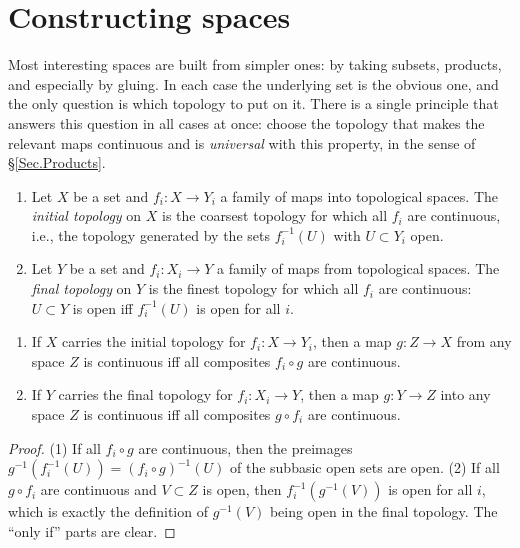 \section{Constructing spaces}\label{sec: constructing spaces}

Most interesting spaces are built from simpler ones: by taking subsets, products, and especially by gluing. In each case the underlying set is the obvious one, and the only question is which topology to put on it. There is a single principle that answers this question in all cases at once: choose the topology that makes the relevant maps continuous and is \emph{universal} with this property, in the sense of \S\ref{Sec.Products}.

\begin{defn}
    \begin{enumerate}
        \item Let $X$ be a set and $f_i:X\to Y_i$ a family of maps into topological spaces. The \emph{initial topology} on $X$ is the coarsest topology for which all $f_i$ are continuous, i.e., the topology generated by the sets $f_i^{-1}(U)$ with $U\subset Y_i$ open.
        \item Let $Y$ be a set and $f_i:X_i\to Y$ a family of maps from topological spaces. The \emph{final topology} on $Y$ is the finest topology for which all $f_i$ are continuous: $U\subset Y$ is open iff $f_i^{-1}(U)$ is open for all $i$.
    \end{enumerate}
\end{defn}

\begin{prop}\label{prop initial final universal}
    \begin{enumerate}
        \item If $X$ carries the initial topology for $f_i:X\to Y_i$, then a map $g:Z\to X$ from any space $Z$ is continuous iff all composites $f_i\circ g$ are continuous.
        \item If $Y$ carries the final topology for $f_i:X_i\to Y$, then a map $g:Y\to Z$ into any space $Z$ is continuous iff all composites $g\circ f_i$ are continuous.
    \end{enumerate}
\end{prop}
\begin{proof}
    (1) If all $f_i\circ g$ are continuous, then the preimages $g^{-1}(f_i^{-1}(U))=(f_i\circ g)^{-1}(U)$ of the subbasic open sets are open. (2) If all $g\circ f_i$ are continuous and $V\subset Z$ is open, then $f_i^{-1}(g^{-1}(V))$ is open for all $i$, which is exactly the definition of $g^{-1}(V)$ being open in the final topology. The ``only if'' parts are clear.
\end{proof}

